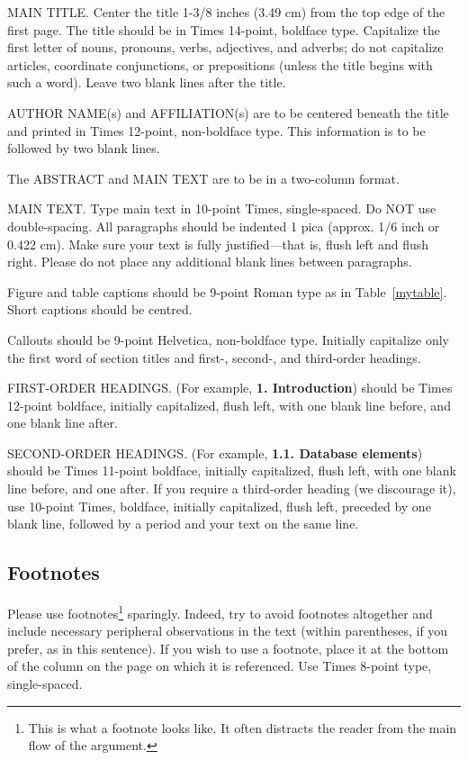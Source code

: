 \documentclass[10pt,twocolumn,letterpaper]{article}
\begin{document}
MAIN TITLE. Center the title 1-3/8 inches (3.49 cm) from the top edge of
the first page. The title should be in Times 14-point, boldface type.
Capitalize the first letter of nouns, pronouns, verbs, adjectives, and
adverbs; do not capitalize articles, coordinate conjunctions, or
prepositions (unless the title begins with such a word). Leave two blank
lines after the title.

AUTHOR NAME(s) and AFFILIATION(s) are to be centered beneath the title
and printed in Times 12-point, non-boldface type. This information is to
be followed by two blank lines.

The ABSTRACT and MAIN TEXT are to be in a two-column format.

MAIN TEXT. Type main text in 10-point Times, single-spaced. Do NOT use
double-spacing. All paragraphs should be indented 1 pica (approx. 1/6
inch or 0.422 cm). Make sure your text is fully justified---that is,
flush left and flush right. Please do not place any additional blank
lines between paragraphs.

Figure and table captions should be 9-point Roman type as in
Table~\ref{mytable}. Short captions should be centred.

\noindent Callouts should be 9-point Helvetica, non-boldface type.
Initially capitalize only the first word of section titles and first-,
second-, and third-order headings.

FIRST-ORDER HEADINGS. (For example, {\large \bf 1. Introduction})
should be Times 12-point boldface, initially capitalized, flush left,
with one blank line before, and one blank line after.

SECOND-ORDER HEADINGS. (For example, { \bf 1.1. Database elements})
should be Times 11-point boldface, initially capitalized, flush left,
with one blank line before, and one after. If you require a third-order
heading (we discourage it), use 10-point Times, boldface, initially
capitalized, flush left, preceded by one blank line, followed by a period
and your text on the same line.

\subsection{Footnotes}

Please use footnotes\footnote {This is what a footnote looks like.  It
often distracts the reader from the main flow of the argument.} sparingly.
Indeed, try to avoid footnotes altogether and include necessary peripheral
observations in
the text (within parentheses, if you prefer, as in this sentence).  If you
wish to use a footnote, place it at the bottom of the column on the page on
which it is referenced. Use Times 8-point type, single-spaced.
\end{document}
